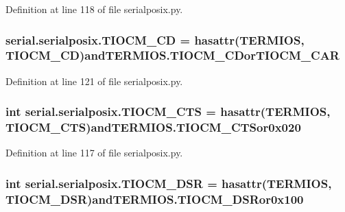 Definition at line 118 of file serialposix.\+py.

\subsubsection[{\texorpdfstring{T\+I\+O\+C\+M\+\_\+\+CD}{TIOCM_CD}}]{\setlength{\rightskip}{0pt plus 5cm}serial.\+serialposix.\+T\+I\+O\+C\+M\+\_\+\+CD = hasattr({\bf T\+E\+R\+M\+I\+OS}, \textquotesingle{}T\+I\+O\+C\+M\+\_\+\+CD\textquotesingle{})and\+T\+E\+R\+M\+I\+O\+S.\+T\+I\+O\+C\+M\+\_\+\+C\+Dor\+T\+I\+O\+C\+M\+\_\+\+C\+AR}\hypertarget{namespaceserial_1_1serialposix_a5250edc9016f47b5efd626675bb9adee}{}\label{namespaceserial_1_1serialposix_a5250edc9016f47b5efd626675bb9adee}


Definition at line 121 of file serialposix.\+py.

\subsubsection[{\texorpdfstring{T\+I\+O\+C\+M\+\_\+\+C\+TS}{TIOCM_CTS}}]{\setlength{\rightskip}{0pt plus 5cm}int serial.\+serialposix.\+T\+I\+O\+C\+M\+\_\+\+C\+TS = hasattr({\bf T\+E\+R\+M\+I\+OS}, \textquotesingle{}T\+I\+O\+C\+M\+\_\+\+C\+TS\textquotesingle{})and\+T\+E\+R\+M\+I\+O\+S.\+T\+I\+O\+C\+M\+\_\+\+C\+T\+Sor0x020}\hypertarget{namespaceserial_1_1serialposix_ae0c61e1ac0b3c8c3f038f00f0fafc055}{}\label{namespaceserial_1_1serialposix_ae0c61e1ac0b3c8c3f038f00f0fafc055}


Definition at line 117 of file serialposix.\+py.

\subsubsection[{\texorpdfstring{T\+I\+O\+C\+M\+\_\+\+D\+SR}{TIOCM_DSR}}]{\setlength{\rightskip}{0pt plus 5cm}int serial.\+serialposix.\+T\+I\+O\+C\+M\+\_\+\+D\+SR = hasattr({\bf T\+E\+R\+M\+I\+OS}, \textquotesingle{}T\+I\+O\+C\+M\+\_\+\+D\+SR\textquotesingle{})and\+T\+E\+R\+M\+I\+O\+S.\+T\+I\+O\+C\+M\+\_\+\+D\+S\+Ror0x100}\hypertarget{namespaceserial_1_1serialposix_a3b74007c7564c28114277c258b1c2e6f}{}\label{namespaceserial_1_1serialposix_a3b74007c7564c28114277c258b1c2e6f}


